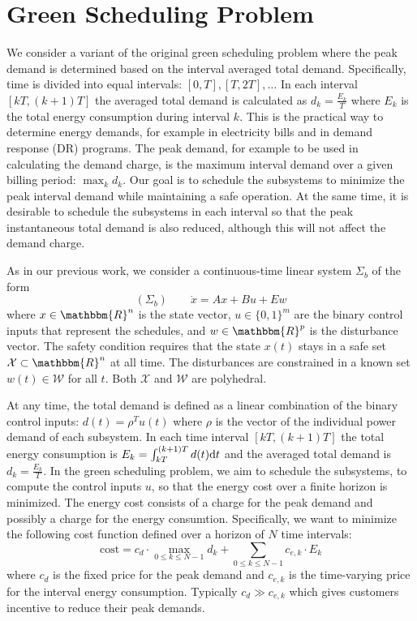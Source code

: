\section{Green Scheduling Problem}


We consider a variant of the original green scheduling problem where the peak
demand is determined based on the interval averaged total demand.
Specifically, time is divided into equal intervals: $[0, T], [T, 2 T], \ldots$
In each interval $[kT, (k + 1) T]$ the averaged total demand is calculated as $d_k = \frac{E_k}{T}$ where $E_k$ is the total energy consumption during interval $k$.
This is the practical way to determine energy demands, for example in electricity bills and in demand response (DR) programs.
The peak demand, for example to be used in calculating the demand charge, is the maximum interval demand over a given billing period: $\max_k d_k$.
Our goal is to schedule the subsystems to minimize the peak interval demand while maintaining a safe operation.
At the same time, it is desirable to schedule the subsystems in each interval so that the peak instantaneous total demand is also reduced, although this will not affect the demand charge.

As in our previous work, we consider a continuous-time linear system $\Sigma_b$ of the form
%
\begin{equation*}
(\Sigma_b) \qquad \dot{x} = Ax + Bu + Ew
\end{equation*}
%
where $x \in \mathbbm{R}^n$ is the state vector, $u \in \{ 0, 1 \}^m$ are the binary control inputs that represent the schedules, and $w \in \mathbbm{R}^p$ is the disturbance vector.
The safety condition requires that the state $x (t)$ stays in a safe set $\mathcal{X} \subset \mathbbm{R}^n$ at all time.
The disturbances are constrained in a known set $w (t) \in \mathcal{W}$ for all $t$.
Both $\mathcal{X}$ and $\mathcal{W}$ are polyhedral.

At any time, the total demand is defined as a linear combination of the binary
control inputs: $d (t) = \rho^T u (t)$ where $\rho$ is the vector of the individual
power demand of each subsystem. In each time interval $[kT, (k + 1) T]$ the
total energy consumption is $E_k = \int_{kT}^{(k + 1) T} d (t) \mathrm{d} t$ and
the averaged total demand is $d_k = \frac{E_k}{T}$. 
In the green scheduling problem, we aim to schedule
the subsystems, \ie to compute the control inputs $u$, so that the energy cost over a finite horizon is minimized.
The energy cost consists of a charge for the peak demand and possibly a charge for the energy
consumtion.
Specifically, we want to minimize the following cost function defined over a horizon of $N$ time intervals:
\begin{equation}
  \label{eq:cost-function} \text{cost} = c_d \cdot \max_{0 \leqslant k
  \leqslant N - 1} d_k + \textstyle\sum_{0 \leqslant k \leqslant N - 1} c_{e, k} \cdot
  E_k
\end{equation}
where $c_d$ is the fixed price for the peak demand and $c_{e, k}$ is the
time-varying price for the interval energy consumption.
Typically $c_d \gg c_{e, k}$ which gives customers incentive to reduce their peak demands.



